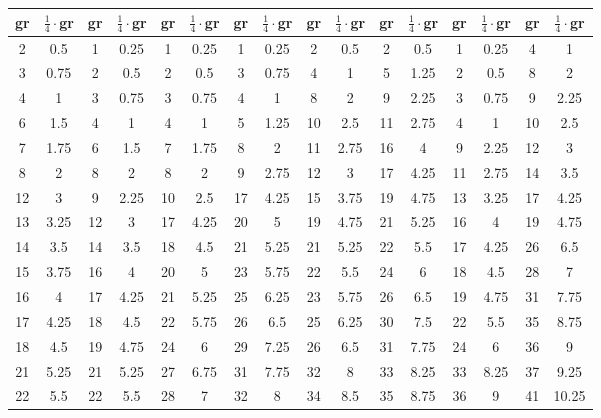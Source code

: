 \documentclass[10pt]{article}
\begin{document}
\begin{table}[ht]
  \centering
  \begin{tabular}{c|c||c|c||c|c||c|c||c|c||c|c||c|c||c|c}
  gr & $\frac{1}{4}\cdot$gr & gr & $\frac{1}{4}\cdot$gr & gr & $\frac{1}{4}\cdot$gr & gr & $\frac{1}{4}\cdot$gr & gr & $\frac{1}{4}\cdot$gr & gr & $\frac{1}{4}\cdot$gr & gr & $\frac{1}{4}\cdot$gr & gr & $\frac{1}{4}\cdot$gr\\
  \hline
  2 & 0.5   & 1 & 0.25  & 1 & 0.25   & 1 & 0.25   & 2 & 0.5    & 2 & 0.5    & 1 & 0.25   & 4 & 1  \\
  3 & 0.75  & 2 & 0.5   & 2 & 0.5    & 3 & 0.75   & 4 & 1      & 5 & 1.25   & 2 & 0.5    & 8 & 2  \\
  4 & 1     & 3 & 0.75  & 3 & 0.75   & 4 & 1      & 8 & 2      & 9 & 2.25   & 3 & 0.75   & 9 & 2.25  \\
  6 & 1.5   & 4 & 1     & 4 & 1      & 5 & 1.25   & 10 & 2.5   & 11 & 2.75  & 4 & 1      & 10 & 2.5  \\
  7 & 1.75  & 6 & 1.5   & 7 & 1.75   & 8 & 2      & 11 & 2.75  & 16 & 4     & 9 & 2.25   & 12 & 3  \\
  8 & 2     & 8 & 2     & 8 & 2      & 9 & 2.75   & 12 & 3     & 17 & 4.25  & 11 & 2.75  & 14 & 3.5  \\
  12 & 3    & 9 & 2.25  & 10 & 2.5   & 17 & 4.25  & 15 & 3.75  & 19 & 4.75  & 13 & 3.25  & 17 & 4.25   \\
  13 & 3.25 & 12 & 3    & 17 & 4.25  & 20 & 5     & 19 & 4.75  & 21 & 5.25  & 16 & 4     & 19 & 4.75  \\
  14 & 3.5  & 14 & 3.5  & 18 & 4.5   & 21 & 5.25  & 21 & 5.25  & 22 & 5.5   & 17 & 4.25  & 26 & 6.5  \\
  15 & 3.75 & 16 & 4    & 20 & 5     & 23 & 5.75  & 22 & 5.5   & 24 & 6     & 18 & 4.5   & 28 & 7  \\
  16 & 4    & 17 & 4.25 & 21 & 5.25  & 25 & 6.25  & 23 & 5.75  & 26 & 6.5   & 19 & 4.75  & 31 & 7.75  \\
  17 & 4.25 & 18 & 4.5  & 22 & 5.75  & 26 & 6.5   & 25 & 6.25  & 30 & 7.5   & 22 & 5.5   & 35 & 8.75  \\
  18 & 4.5  & 19 & 4.75 & 24 & 6     & 29 & 7.25  & 26 & 6.5   & 31 & 7.75  & 24 & 6     & 36 & 9  \\
  21 & 5.25 & 21 & 5.25 & 27 & 6.75  & 31 & 7.75  & 32 & 8     & 33 & 8.25  & 33 & 8.25  & 37 & 9.25  \\
  22 & 5.5  & 22 & 5.5  & 28 & 7     & 32 & 8     & 34 & 8.5   & 35 & 8.75  & 36 & 9     & 41 & 10.25  \\

\end{tabular}
\end{table}
\end{document}
